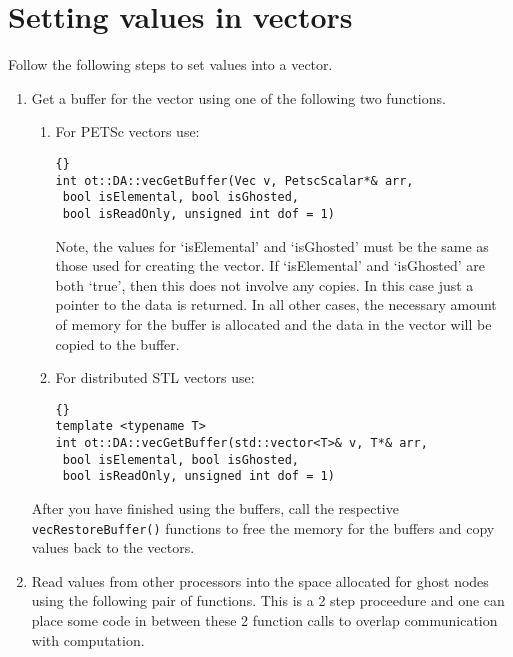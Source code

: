 \documentclass[12pt,reqno,a4paper]{report}
\numberwithin{equation}{section}
\begin{document}
\section{Setting values in vectors}
\label{sec:vecbuffers}
Follow the following steps to set values into a vector.

\begin{enumerate}

\item Get a buffer for the vector using one of the following two functions.

\begin{enumerate}

\item For PETSc vectors use: 

\begin{lstlisting}[frame=trbl, fontadjust]{}
int ot::DA::vecGetBuffer(Vec v, PetscScalar*& arr, 
 bool isElemental, bool isGhosted,
 bool isReadOnly, unsigned int dof = 1)
\end{lstlisting}

Note, the values for `isElemental' and `isGhosted' must be the same as those used for creating the vector. 
If `isElemental' and `isGhosted' are both `true', then this does not involve any copies. In this case
 just a pointer to the data is returned. In all other cases, the necessary amount of memory for the buffer
 is allocated and the data in the vector will be copied to the buffer. 

\item For distributed STL vectors use:

\begin{lstlisting}[frame=trbl, fontadjust]{}
template <typename T>
int ot::DA::vecGetBuffer(std::vector<T>& v, T*& arr,
 bool isElemental, bool isGhosted,
 bool isReadOnly, unsigned int dof = 1)
\end{lstlisting}

\end{enumerate}

After you have finished using the buffers, call the respective \lstinline[basicstyle=\bfseries]!vecRestoreBuffer()! functions to free the memory for the buffers and copy values back to the vectors.

\item Read values from other processors into the space allocated for ghost nodes using the following pair of functions. This is a 2 step proceedure and one can place some code in between these 2 function calls to overlap communication with computation. 


\end{enumerate}
\end{document}
